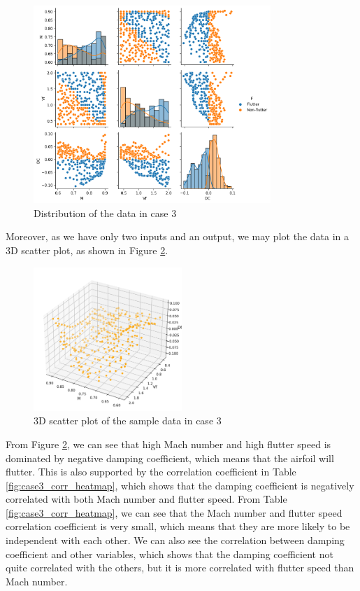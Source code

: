 \documentclass[conf]{new-aiaa}
\begin{document}
\begin{figure}
    \centering
    \includegraphics[width=0.8\textwidth]{graph/case3_data_dist_hue.png}
    \caption{Distribution of the data in case 3}
    \label{fig:case3_data_dist}
\end{figure}
Moreover, as we have only two inputs and an output, we may plot the data in a 3D scatter plot, as shown in Figure \ref{fig:case3_3d_scatter}.
\begin{figure}
    \centering
    \includegraphics[width=0.5\textwidth]{graph/case3_3d_scatter.png}
    \caption{3D scatter plot of the sample data in case 3}
    \label{fig:case3_3d_scatter}
\end{figure}
From Figure \ref{fig:case3_3d_scatter}, we can see that high Mach number and high flutter speed is dominated by negative damping coefficient, which means that the airfoil will flutter. This is also supported by the correlation coefficient in Table \ref{fig:case3_corr_heatmap}, which shows that the damping coefficient is negatively correlated with both Mach number and flutter speed. From Table \ref{fig:case3_corr_heatmap}, we can see that the Mach number and flutter speed correlation coefficient is very small, which means that they are more likely to be independent with each other. We can also see the correlation between damping coefficient and other variables, which shows that the damping coefficient not quite correlated with the others, but it is more correlated with flutter speed than Mach number.
\end{document}
